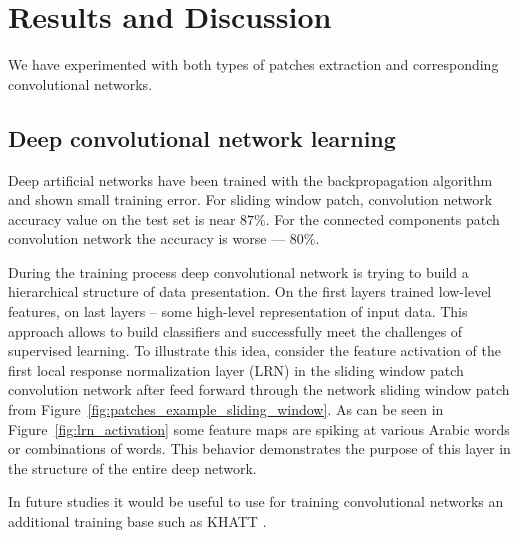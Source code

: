 \documentclass[conference]{IEEEtran}
\begin{document}

\section{Results and Discussion}
\label{sec:results_and_description}

We have experimented with both types of patches extraction and corresponding convolutional networks. 

\subsection{Deep convolutional network learning}


Deep artificial networks have been trained with the backpropagation algorithm \cite{CNN} and shown small training error. For sliding window patch, convolution network accuracy value on the test set is near $87 \%$. For the connected components patch convolution network the accuracy is worse --- $80 \%$. 

During the training process deep convolutional network is trying to build a hierarchical structure of data presentation. On the first layers trained low-level features, on last layers -- some high-level representation of input data. This approach allows to build classifiers and successfully meet the challenges of supervised learning. To illustrate this idea, consider the feature activation of the first local response normalization layer (LRN) in the sliding window patch convolution network after feed forward through the network sliding window patch from Figure~\ref{fig:patches_example_sliding_window}. As can be seen in Figure~\ref{fig:lrn_activation} some feature maps are spiking at various Arabic words or combinations of words. This behavior demonstrates the purpose of this layer in the structure of the entire deep network.

In future studies it would be useful to use for training convolutional networks an additional training base such as KHATT \cite{khatt}.
\end{document}
